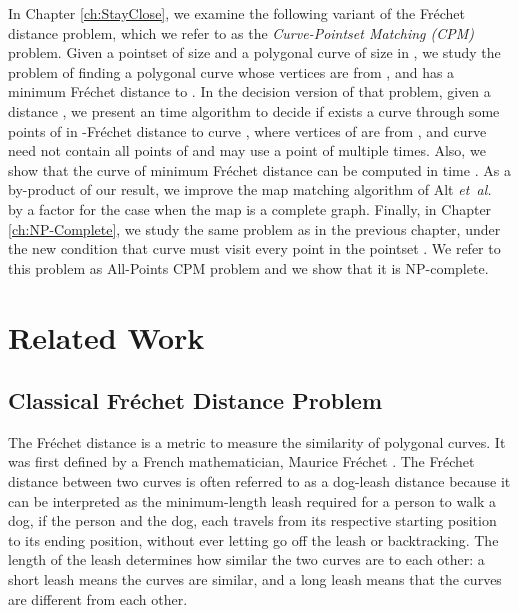 \documentclass[12pt]{dalthesis}
\newcommand{\etal}{{\em et~al.\/}}
\newcommand{\REM}[1]{}
\newcommand{\Frechet}{Fr\'echet }
\begin{document}
In Chapter \ref{ch:StayClose},
we examine the following variant
of the \Frechet distance problem, 
which we refer to as the \emph{Curve-Pointset Matching (CPM)} problem. 
Given a pointset  of size  and a polygonal 
curve  of size  in ,
we study the problem of finding a polygonal curve  whose vertices are from  ,	
and has a minimum \Frechet distance to . 
In the decision version of that problem, 
given a distance , we 
present an  time algorithm 
to decide if exists a curve  through some points of 
in -\Frechet distance to curve , 
where vertices of  are from , 
and curve  need not contain all points of  
and may use a point of  multiple times. 
Also, we show that the
curve of minimum \Frechet distance can be computed in
time .
As a by-product of our result, 
we improve the map matching algorithm of Alt \etal\ \cite{AltERW03a}
by a  factor for the case when the map is a complete graph.
Finally, in Chapter \ref{ch:NP-Complete}, we 
study the same problem as in the previous chapter, 
under the new condition that 
curve  must visit every point in the pointset .
We refer to this problem 
as All-Points CPM problem and 
we show that it is NP-complete. 

\REM{
Finally, in Chapter \ref{ch:SpecialCase},
we study some special cases of  All-Points CPM problem, 
where  instead of a general curve, the input to the problem is 
a convex -monotone curve, 
convex -monotone curve (or convex -monotone curve) or
a convex polygon. 
}
	

\clearpage{}


\clearpage{}\chapter{Related Work}
\label{ch:related}




\section{Classical \Frechet Distance Problem }
\label{sec:classicalFD}
The \Frechet distance is a metric to measure the similarity of polygonal curves. It was first defined by a French mathematician,
Maurice \Frechet \cite{FirstFD}.
The \Frechet distance between two curves is 
often referred to as a dog-leash distance because
it can be interpreted as the minimum-length leash required for a person to walk a dog,
if the person and the dog, each travels from its respective starting position to its ending position, without ever letting go off the leash or backtracking.
The length of the leash determines how similar the two curves are to each other:
a short leash means the curves are similar,
and a long leash means that the curves are different from each other.
\end{document}
